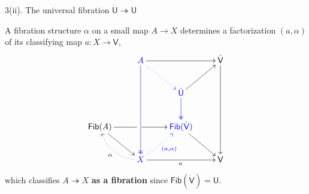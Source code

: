 \documentclass[handout]{beamer}
\newcommand{\myemph}[1]{\textbf{#1}}    %
\newcommand{\ra}{\ensuremath{\rightarrow}}
\renewcommand{\epi}{\twoheadrightarrow}
\newcommand{\U}{\mathsf{U}}
\newcommand{\UU}{\dot{\mathsf{U}}}
\newcommand{\V}{\mathsf{V}}
\newcommand{\VV}{\dot{\mathsf{V}}}
\theoremstyle{remark}
\begin{document}
\begin{frame}{3(ii). The universal fibration $\UU\epi\U$}

A fibration structure $\alpha$ on a small map $A\ra X$ determines a factorization $(a,\alpha)$ of its classifying map $a:X\ra\V$, 
\[
\xymatrix{
& {\color{blue}A} \ar@[blue]@{->>}[ddd] \ar[rr]  \ar@[blue]@{.>}[rd] && {\VV}\ar[ddd]\\
& & {\color{blue}\UU} \ar@[blue]@{->>}[d] \ar[ru]  &\\
\mathsf{Fib}(A) \ar[rd] \ar[rr] |<<<<<<<<<<<\hole  &&  {\color{blue}\mathsf{Fib}(\VV)}  \ar[rd] &\\
& {\color{blue}X} \ar[rr]_a \ar@{.>}@/^1pc/[lu]^\alpha \ar@[blue]@{.>}[ru]_>>>>>>>{\color{blue}(a,\alpha)} && \V
}
\]
which classifies $A\epi X$ \myemph{as a fibration} since $\mathsf{Fib}(\VV)  = \U$.

\end{frame}
%
%
%
%
%
%
%
\end{document}

